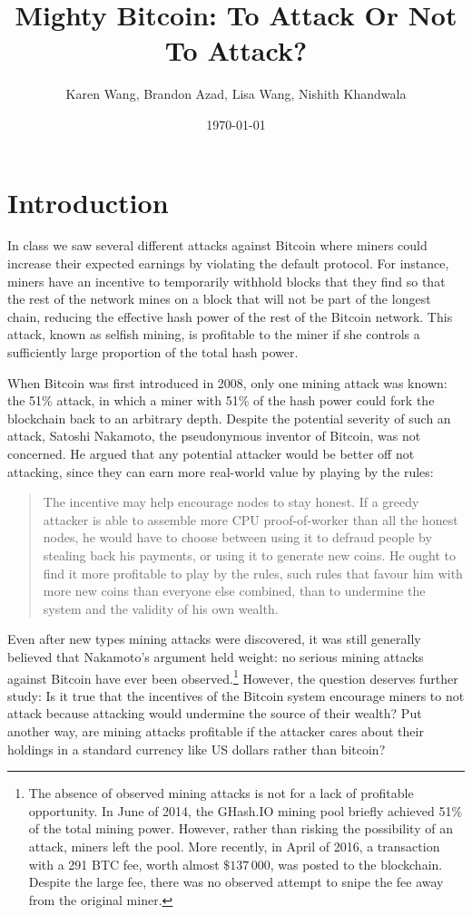 \documentclass[12pt]{article}
\title{Mighty Bitcoin: To Attack Or Not To Attack?}
\author{Karen Wang, Brandon Azad, Lisa Wang, Nishith Khandwala}
\date{\today}
\begin{document}
\maketitle

\section{Introduction}

In class we saw several different attacks against Bitcoin where miners could increase their expected earnings by violating the default protocol. For instance, miners have an incentive to temporarily withhold blocks that they find so that the rest of the network mines on a block that will not be part of the longest chain, reducing the effective hash power of the rest of the Bitcoin network. This attack, known as selfish mining, is profitable to the miner if she controls a sufficiently large proportion of the total hash power.\cite{eyal2014majority}

When Bitcoin was first introduced in 2008, only one mining attack was known: the 51\% attack, in which a miner with 51\% of the hash power could fork the blockchain back to an arbitrary depth.
Despite the potential severity of such an attack,
Satoshi Nakamoto, the pseudonymous inventor of Bitcoin, was not concerned.
He argued that any potential attacker would be better off not attacking, since they can earn more real-world value by playing by the rules:
\begin{quote}
The incentive may help encourage nodes to stay honest. If a greedy attacker is able to assemble more CPU proof-of-worker than all the honest nodes, he would have to choose between using it to defraud people by stealing back his payments, or using it to generate new coins. He ought to find it more profitable to play by the rules, such rules that favour him with more new coins than everyone else combined, than to undermine the system and the validity of his own wealth.\cite{nakamoto2008bitcoin}
\end{quote}

Even after new types mining attacks were discovered, it was still generally believed that Nakamoto's argument held weight: no serious mining attacks against Bitcoin have ever been observed.\footnote{
  The absence of observed mining attacks is not for a lack of profitable opportunity. In June of 2014, the GHash.IO mining pool briefly achieved 51\% of the total mining power. However, rather than risking the possibility of an attack, miners left the pool.\cite{ghashio51}
  More recently, in April of 2016, a transaction with a 291 BTC fee, worth almost $\$137\,000$, was posted to the blockchain.\cite{291btcfee} Despite the large fee, there was no observed attempt to snipe the fee away from the original miner.
} However, the question deserves further study: Is it true that the incentives of the Bitcoin system encourage miners to not attack because attacking would undermine the source of their wealth?
Put another way, are mining attacks profitable if the attacker cares about their holdings in a standard currency like US dollars rather than bitcoin?
\end{document}

